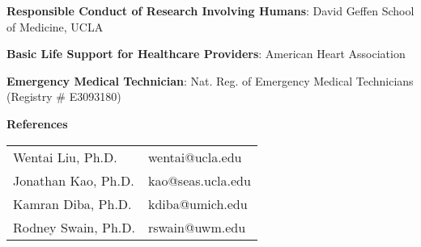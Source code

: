\documentclass[10pt, oneside]{article}
\begin{document}
    \textbf{Responsible Conduct of Research Involving Humans}:  David Geffen School of Medicine, UCLA
 

	  \textbf{Basic Life Support for Healthcare Providers}: American Heart Association
	  
	 \textbf{Emergency Medical Technician}: Nat. Reg. of Emergency Medical Technicians (Registry \# E3093180)

{\Large \textbf{References}} \hrulefill
\begin{table}[h!]
    \begin{tabular}{ll}
         Wentai Liu, Ph.D. &\faEnvelope{} wentai@ucla.edu \\
Jonathan Kao, Ph.D. &  \faEnvelope{} kao@seas.ucla.edu\\
Kamran Diba, Ph.D. &\faEnvelope{} kdiba@umich.edu \\
Rodney Swain, Ph.D. & \faEnvelope{} rswain@uwm.edu   
    \end{tabular}
\end{table}



\end{document}
